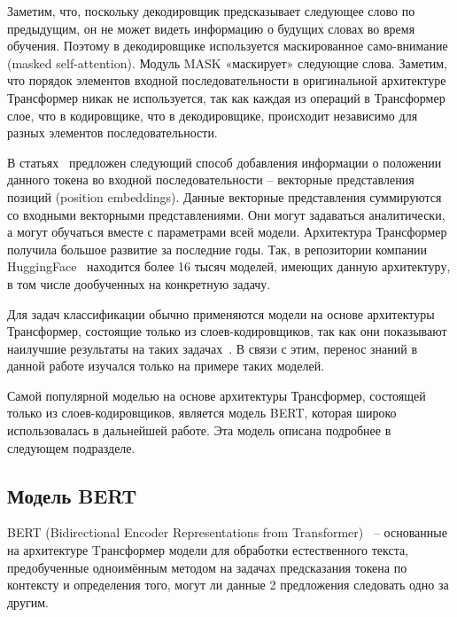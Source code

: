  Заметим, что, поскольку декодировщик предсказывает следующее слово по предыдущим, он не может видеть информацию о будущих словах во время обучения. Поэтому в декодировщике используется маскированное само-внимание (masked self-attention). Модуль MASK «маскирует» следующие слова.
Заметим, что порядок элементов входной последовательности в оригинальной архитектуре Трансформер никак не используется, так как каждая из операций в Трансформер слое, что в кодировщике, что в декодировщике, происходит независимо для разных элементов последовательности. 

В статьях~\cite{devlin_2018,gehring_2017,vaswani_2017} предложен следующий способ добавления информации о положении данного токена во входной последовательности -- векторные представления позиций (position embeddings). Данные векторные представления суммируются со входными векторными представлениями. Они могут задаваться аналитически, а могут обучаться вместе с параметрами всей модели.
Архитектура Трансформер получила большое развитие за последние годы. Так, в репозитории компании HuggingFace~\cite{na_website_ndaa} находится более 16 тысяч моделей, имеющих данную архитектуру, в том числе дообученных на конкретную задачу. 

Для задач классификации обычно применяются модели на основе архитектуры Трансформер, состоящие только из слоев-кодировщиков, так как они показывают наилучшие результаты на таких задачах~\cite{encoder_only,encoder_models}. В связи с этим, перенос знаний в данной работе изучался только на примере таких моделей.

Самой популярной моделью на основе архитектуры Трансформер, состоящей только из слоев-кодировщиков, является модель BERT, которая широко использовалась в дальнейшей работе. Эта модель описана подробнее в следующем подразделе. 

\subsection{Модель BERT}

BERT (Bidirectional Encoder Representations from Transformer)~\cite{devlin_2018} -- основанные на архитектуре Tрансформер модели для обработки естественного текста, предобученные одноимённым методом на задачах предсказания токена по контексту и определения того, могут ли данные 2 предложения следовать одно за другим. 

